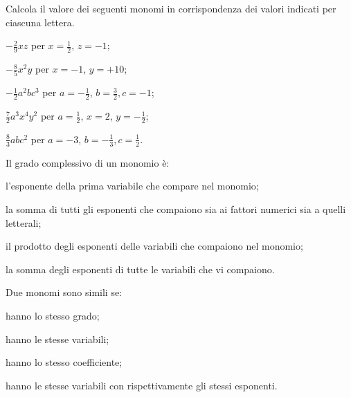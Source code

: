 \begin{esercizio}
 \label{ese:9.5}
 Calcola il valore dei seguenti monomi in corrispondenza dei valori indicati per ciascuna lettera.

\begin{multicols}{2}
\begin{enumeratea}
 \item $-\frac{2}{9}xz$ per $ x=\frac{1}{2} $, $z=-1$;
 \item $-\frac{8}{5}x^{2}y$ per $ x=-1 $, $y=+10$;
 \item $-\frac{1}{2}a^{2}bc^3$ per $ a=-\frac{1}{2} $, $b=\frac{3}{2},c=-1$;
 \item $\frac{7}{2}a^{3}x^{4}y^2$ per $ a=\frac{1}{2} $, $x=2$, $y=-\frac{1}{2}$;
 \item $\frac{8}{3}abc^2$ per $ a=-3 $, $b=-\frac{1}{3},c=\frac{1}{2}$.
\end{enumeratea}
\end{multicols}
\end{esercizio}


\begin{esercizio}
 \label{ese:9.6}
 Il grado complessivo di un monomio è:

\begin{enumeratea}
 \item l'esponente della prima variabile che compare nel monomio;
 \item la somma di tutti gli esponenti che compaiono sia ai fattori
numerici sia a quelli letterali;
 \item il prodotto degli esponenti delle variabili che compaiono nel monomio;
 \item la somma degli esponenti di tutte le variabili che vi compaiono.
\end{enumeratea}
\end{esercizio}


\begin{esercizio}
 \label{ese:9.7}
Due monomi sono simili se:

\begin{enumeratea}
 \item hanno lo stesso grado;
 \item hanno le stesse variabili;
 \item hanno lo stesso coefficiente;
 \item hanno le stesse variabili con rispettivamente gli stessi esponenti.
\end{enumeratea}
\end{esercizio}


